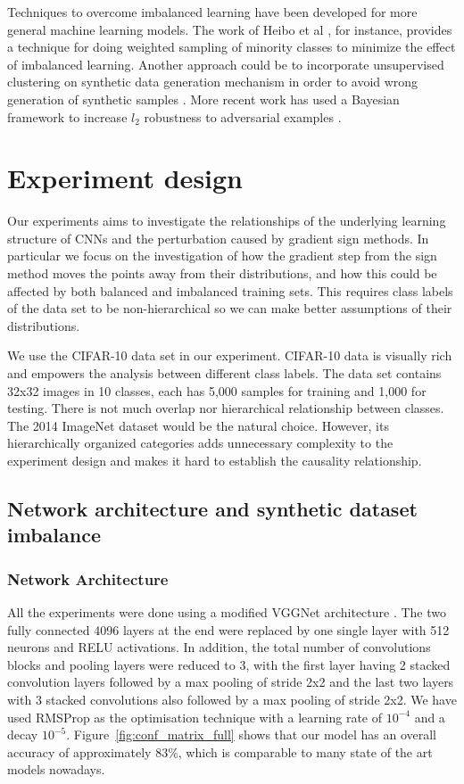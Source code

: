 \documentclass[runningheads,a4paper]{llncs}
\begin{document}
Techniques to overcome imbalanced learning have been developed for more general machine learning models. The work of Heibo et al \cite{he2008adasyn}, for instance, provides a technique for doing weighted sampling of minority classes to minimize the effect of imbalanced learning. Another approach could be to incorporate unsupervised clustering on synthetic data generation mechanism in order to avoid wrong generation of synthetic samples \cite{Barua2011}. More recent work has used a Bayesian framework to increase $l_2$ robustness to adversarial examples \cite{billovits}.

\section{Experiment design}

Our experiments aims to investigate the relationships of the underlying learning structure of CNNs and the perturbation caused by gradient sign methods. In particular we focus on the investigation of how the gradient step from the sign method moves the points away from their distributions, and how this could be affected by both balanced and imbalanced training sets. This requires  class labels of the data set to be non-hierarchical so we can make better assumptions of their distributions. 

We use the CIFAR-10 data set \cite{krizhevsky_2009} in our experiment. CIFAR-10 data is visually rich and empowers the analysis between different class labels. The data set contains 32x32 images in 10 classes, each has 5,000 samples for training and 1,000 for testing. There is not much overlap nor hierarchical relationship between classes. The 2014 ImageNet dataset \cite{deng2009imagenet} would be the natural choice. However, its hierarchically organized categories adds unnecessary complexity to the experiment design and makes it hard to establish the causality relationship.
\subsection{Network architecture and synthetic dataset imbalance}

\subsubsection{Network Architecture} All the experiments were done using a modified VGGNet architecture \cite{simonyan2014very}. The two fully connected 4096 layers at the end were replaced by one single layer with 512 neurons and RELU activations. In addition, the total number of convolutions blocks and pooling layers were reduced to 3, with the first layer having 2 stacked convolution layers followed by a max pooling of stride 2x2 and the last two layers with 3 stacked convolutions also followed by a max pooling of stride 2x2. We have used RMSProp  \cite{bengiormsprop} as the optimisation technique with a learning rate of $10^{-4}$ and a decay $10^{-5}$. Figure~\ref{fig:conf_matrix_full} shows that our model has an overall accuracy of approximately 83\%, which is comparable to many state of the art models nowadays.
\end{document}

